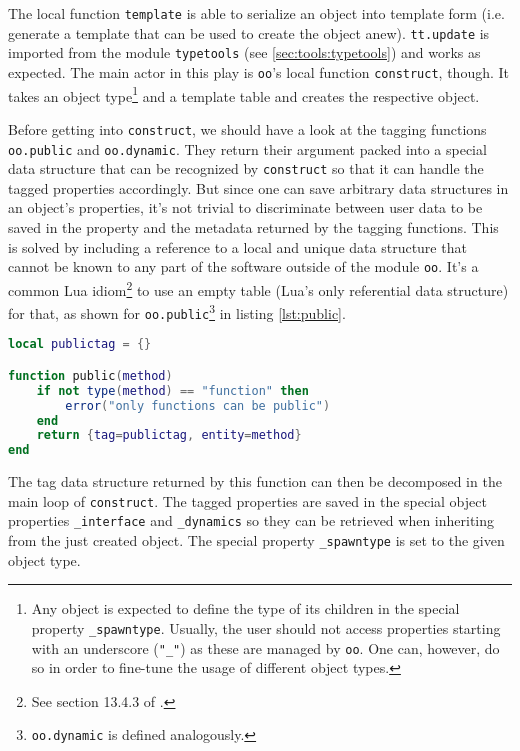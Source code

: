 The local function \texttt{template} is able to serialize an object into template form (i.e. generate a template that can be used to create the object anew). \texttt{tt.update} is imported from the module \texttt{typetools} (see \ref{sec:tools:typetools}) and works as expected. The main actor in this play is \texttt{oo}'s local function \texttt{construct}, though. It takes an object type\footnote{Any object is expected to define the type of its children in the special property \texttt{\_spawntype}. Usually, the user should not access properties starting with an underscore (\texttt{"\_"}) as these are managed by \texttt{oo}. One can, however, do so in order to fine-tune the usage of different object types.} and a template table and creates the respective object.

Before getting into \texttt{construct}, we should have a look at the tagging functions \texttt{oo.public} and \texttt{oo.dynamic}. They return their argument packed into a special data structure that can be recognized by \texttt{construct} so that it can handle the tagged properties accordingly. But since one can save arbitrary data structures in an object's properties, it's not trivial to discriminate between user data to be saved in the property and the metadata returned by the tagging functions. This is solved by including a reference to a local and unique data structure that cannot be known to any part of the software outside of the module \texttt{oo}. It's a common Lua idiom\footnote{See section 13.4.3 of \cite{Ierusalimschy2006}.} to use an empty table (Lua's only referential data structure) for that, as shown for \texttt{oo.public}\footnote{\texttt{oo.dynamic} is defined analogously.} in listing \ref{lst:public}.

\begin{lstlisting}[language=lua, caption={The definition of \texttt{oo.public} from \texttt{"oo.lua"}}, label=lst:public, name=lst:public]
local publictag = {}

function public(method)
    if not type(method) == "function" then
        error("only functions can be public")
    end
    return {tag=publictag, entity=method}
end
\end{lstlisting}

The tag data structure returned by this function can then be decomposed in the main loop of \texttt{construct}. The tagged properties are saved in the special object properties \texttt{\_interface} and \texttt{\_dynamics} so they can be retrieved when inheriting from the just created object. The special property \texttt{\_spawntype} is set to the given object type.

